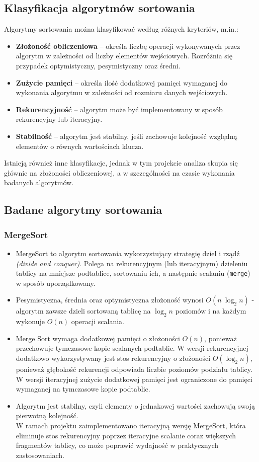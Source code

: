 \documentclass[polish,a4paper]{article}
\begin{document}
\subsection{Klasyfikacja algorytmów sortowania}
Algorytmy sortowania można klasyfikować według różnych kryteriów, m.in.:
\begin{itemize}
    \item \textbf{Złożoność obliczeniowa} – określa liczbę operacji wykonywanych przez algorytm w zależności od liczby elementów wejściowych. Rozróżnia się przypadek optymistyczny, pesymistyczny oraz średni.
    \item \textbf{Zużycie pamięci} – określa ilość dodatkowej pamięci wymaganej do wykonania algorytmu w zależności od rozmiaru danych wejściowych.
    \item \textbf{Rekurencyjność} – algorytm może być implementowany w sposób rekurencyjny lub iteracyjny.
    \item \textbf{Stabilność} – algorytm jest stabilny, jeśli zachowuje kolejność względną elementów o równych wartościach klucza.
\end{itemize}

Istnieją również inne klasyfikacje, jednak w tym projekcie analiza skupia się głównie na złożoności obliczeniowej, a w szczególności na czasie wykonania badanych algorytmów.

\subsection{Badane algorytmy sortowania}
\subsubsection{MergeSort}
\begin{itemize}
	\item{MergeSort to algorytm sortowania wykorzystujący strategię dziel i rządź \textit{(divide and conquer)}. Polega na rekurencyjnym (lub iteracyjnym) dzieleniu tablicy na mniejsze podtablice, sortowaniu ich, a następnie scalaniu (\texttt{merge}) w sposób uporządkowany.}
	\item{Pesymistyczna, średnia oraz optymistyczna złożoność wynosi $O(n \ \log_2 n)$ - algorytm zawsze dzieli sortowaną tablicę na $\log_2 n$ poziomów i na każdym wykonuje $O(n)$ operacji scalania.}
	\item{Merge Sort wymaga dodatkowej pamięci o złożoności $O(n)$, ponieważ przechowuje tymczasowe kopie scalanych podtablic. W wersji rekurencyjnej dodatkowo wykorzystywany jest stos rekurencyjny o złożoności $O(\log_2 n)$, ponieważ głębokość rekurencji odpowiada liczbie poziomów podziału tablicy. W wersji iteracyjnej zużycie dodatkowej pamięci jest ograniczone do pamięci wymaganej na tymczasowe kopie podtablic.}
	\item{Algorytm jest stabilny, czyli elementy o jednakowej wartości zachowują swoją pierwotną kolejność. \\
W ramach projektu zaimplementowano iteracyjną wersję MergeSort, która eliminuje stos rekurencyjny poprzez iteracyjne scalanie coraz większych fragmentów tablicy, co może poprawić wydajność w praktycznych zastosowaniach.}
\end{itemize}
\end{document}
